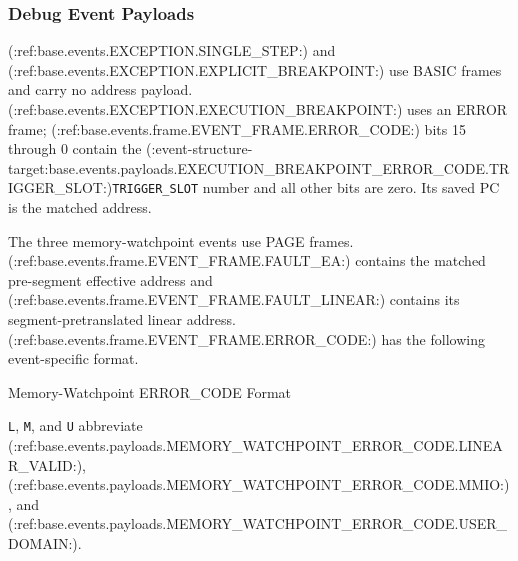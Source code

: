 \subsubsection{Debug Event Payloads}
(:ref:base.events.EXCEPTION.SINGLE_STEP:) and
(:ref:base.events.EXCEPTION.EXPLICIT_BREAKPOINT:) use BASIC frames and carry no address payload.
(:ref:base.events.EXCEPTION.EXECUTION_BREAKPOINT:) uses an ERROR frame; (:ref:base.events.frame.EVENT_FRAME.ERROR_CODE:) bits 15 through 0 contain the
(:event-structure-target:base.events.payloads.EXECUTION_BREAKPOINT_ERROR_CODE.TRIGGER_SLOT:)\texttt{TRIGGER\_SLOT} number and all other bits are zero. Its saved PC is the matched address.

The three memory-watchpoint events use PAGE frames. (:ref:base.events.frame.EVENT_FRAME.FAULT_EA:) contains the matched pre-segment effective address and
(:ref:base.events.frame.EVENT_FRAME.FAULT_LINEAR:) contains its segment-pretranslated linear address. (:ref:base.events.frame.EVENT_FRAME.ERROR_CODE:) has the following event-specific format.

\begin{BedrockListedFormatDiagram}{Memory-Watchpoint ERROR\_CODE Format}
\end{BedrockListedFormatDiagram}
{\small \texttt{L}, \texttt{M}, and \texttt{U} abbreviate (:ref:base.events.payloads.MEMORY_WATCHPOINT_ERROR_CODE.LINEAR_VALID:), (:ref:base.events.payloads.MEMORY_WATCHPOINT_ERROR_CODE.MMIO:), and
(:ref:base.events.payloads.MEMORY_WATCHPOINT_ERROR_CODE.USER_DOMAIN:).\par}

